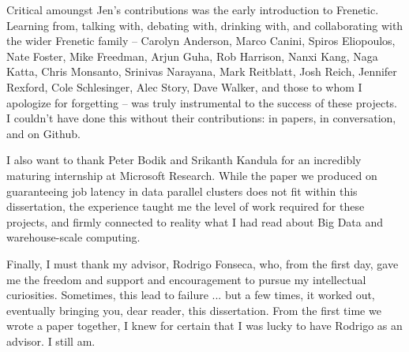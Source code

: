 Critical amoungst Jen's contributions was the early introduction to Frenetic.
Learning from, talking with, debating with, drinking with, and collaborating
with the wider Frenetic family --
Carolyn Anderson, Marco Canini, Spiros Eliopoulos, Nate Foster, Mike Freedman,
Arjun Guha, Rob Harrison, Nanxi Kang, Naga Katta, Chris Monsanto, Srinivas Narayana,
Mark Reitblatt, Josh Reich, Jennifer Rexford, Cole Schlesinger, Alec Story,
Dave Walker, and those to whom I apologize for forgetting
-- was truly instrumental to the success of these projects.
I couldn't have done this without their contributions: in papers, in conversation,
and on Github.

I also want to thank Peter Bodik and Srikanth Kandula for an incredibly maturing
internship at Microsoft Research. While the paper we produced on guaranteeing job
latency in data parallel clusters does not fit
within this dissertation, the experience taught me the level of work required for
these projects, and firmly connected to reality what I had read about Big Data
and warehouse-scale computing.

Finally, I must thank my advisor, Rodrigo Fonseca, who, from the first day,
gave me the freedom and support and encouragement to pursue my intellectual
curiosities. Sometimes, this lead to failure ... but a few times, it worked out,
eventually bringing you, dear reader, this dissertation. From the first time
we wrote a paper together, I knew for certain that I was lucky to have Rodrigo
as an advisor. I still am.
